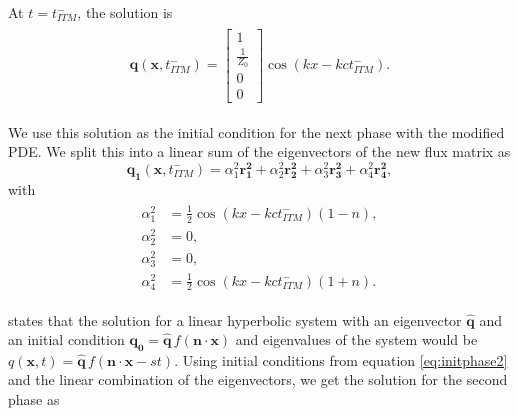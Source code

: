 At $t = t_{ITM}^-$, the solution is 
\begin{align}
    \begin{split}
        \mathbf{q}\left(\mathbf{x}, t_{ITM}^-\right) = \begin{bmatrix}
            1 \\
            \frac{1}{Z_0} \\
            0 \\
            0
            \end{bmatrix} \cos\left(kx - k c t_{ITM}^-\right) .
    \end{split}
    \label{eq:initphase2}
\end{align}

We use this solution as the initial condition for the next phase with the modified \ac{PDE}. We split this into a linear sum of the eigenvectors of the new flux matrix
as 
\begin{equation}
    \mathbf{q_1}\left(\mathbf{x}, t_{ITM}^-\right) = \alpha_1^2 \mathbf{r_1^2} + \alpha_2^2 \mathbf{r_2^2} + \alpha_3^2 \mathbf{r_3^2} + \alpha_4^2 \mathbf{r_4^2},
    \label{eq:linearsum}
\end{equation}
with
\begin{align}
    \begin{split}
        \alpha_1^2 &= \frac{1}{2}\cos\left(kx - k c t_{ITM}^-\right) \left(1 - n\right), \\
        \alpha_2^2 &= 0, \\
        \alpha_3^2 &= 0, \\
        \alpha_4^2 &= \frac{1}{2}\cos\left(kx - k c t_{ITM}^-\right) \left(1 + n\right) .
    \end{split}
\end{align}

\parencite[Sec 18.5]{leveque_2002} states that the solution for a linear hyperbolic system with an eigenvector $\mathbf{\hat{q}}$ and an initial condition $\mathbf{q_0} = \mathbf{\hat{q}} \, f\left(\mathbf{n} \cdot \mathbf{x}\right)$
and eigenvalues of the system would be $q\left(\mathbf{x}, t\right) = \mathbf{\hat{q}} \, f\left( \mathbf{n} \cdot \mathbf{x} - s t\right)$. 
Using initial conditions from equation \ref{eq:initphase2} and the linear combination of the eigenvectors, we get the solution for the second phase as

